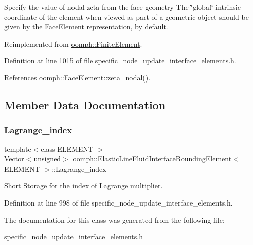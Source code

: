 Specify the value of nodal zeta from the face geometry The \char`\"{}global\char`\"{} intrinsic coordinate of the element when viewed as part of a geometric object should be given by the \hyperlink{classoomph_1_1FaceElement}{Face\+Element} representation, by default. 



Reimplemented from \hyperlink{classoomph_1_1FiniteElement_a849561c5fbcbc07dc49d2dc6cca68559}{oomph\+::\+Finite\+Element}.



Definition at line 1015 of file specific\+\_\+node\+\_\+update\+\_\+interface\+\_\+elements.\+h.



References oomph\+::\+Face\+Element\+::zeta\+\_\+nodal().



\subsection{Member Data Documentation}
\mbox{\label{classoomph_1_1ElasticLineFluidInterfaceBoundingElement_ab60624e63f1ef1b59d191a83b16eb1de}} 
\subsubsection{\texorpdfstring{Lagrange\+\_\+index}{Lagrange\_index}}
{\footnotesize\ttfamily template$<$class E\+L\+E\+M\+E\+NT $>$ \\
\hyperlink{classoomph_1_1Vector}{Vector}$<$unsigned$>$ \hyperlink{classoomph_1_1ElasticLineFluidInterfaceBoundingElement}{oomph\+::\+Elastic\+Line\+Fluid\+Interface\+Bounding\+Element}$<$ E\+L\+E\+M\+E\+NT $>$\+::Lagrange\+\_\+index\hspace{0.3cm}{\ttfamily [private]}}



Short Storage for the index of Lagrange multiplier. 



Definition at line 998 of file specific\+\_\+node\+\_\+update\+\_\+interface\+\_\+elements.\+h.



The documentation for this class was generated from the following file\+:\begin{DoxyCompactItemize}
\item 
\hyperlink{specific__node__update__interface__elements_8h}{specific\+\_\+node\+\_\+update\+\_\+interface\+\_\+elements.\+h}\end{DoxyCompactItemize}
